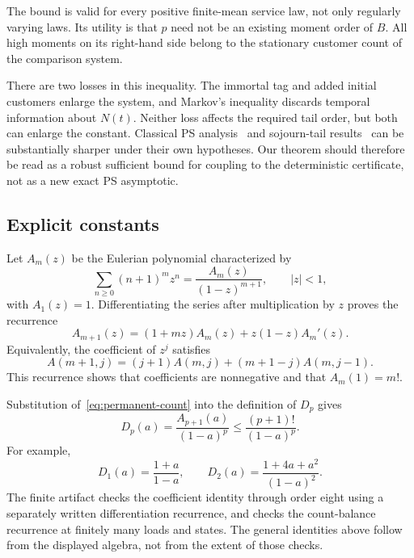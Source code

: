 The bound is valid for every positive finite-mean service law, not only regularly varying laws. Its utility is that $p$ need not be an existing moment order of $B$. All high moments on its right-hand side belong to the stationary customer count of the comparison system.

There are two losses in this inequality. The immortal tag and added initial customers enlarge the system, and Markov's inequality discards temporal information about $N(t)$. Neither loss affects the required tail order, but both can enlarge the constant. Classical PS analysis~\cite{yashkov1987} and sojourn-tail results~\cite{zwartboxma2000,guillemin2004,borst2006} can be substantially sharper under their own hypotheses. Our theorem should therefore be read as a robust sufficient bound for coupling to the deterministic certificate, not as a new exact PS asymptotic.

\subsection{Explicit constants}
Let $A_m(z)$ be the Eulerian polynomial characterized by
\begin{equation}\label{eq:eulerian-series}
 \sum_{n\geq0}(n+1)^m z^n
    =\frac{A_m(z)}{(1-z)^{m+1}},\qquad |z|<1,
\end{equation}
with $A_1(z)=1$. Differentiating the series after multiplication by $z$ proves the recurrence
\begin{equation}\label{eq:eulerian-recurrence}
 A_{m+1}(z)=(1+mz)A_m(z)+z(1-z)A_m'(z).
\end{equation}
Equivalently, the coefficient of $z^j$ satisfies
\[
 A(m+1,j)=(j+1)A(m,j)+(m+1-j)A(m,j-1).
\]
This recurrence shows that coefficients are nonnegative and that $A_m(1)=m!$.

Substitution of~\eqref{eq:permanent-count} into the definition of $D_p$ gives
\begin{equation}\label{eq:moment-eulerian}
 D_p(a)=\frac{A_{p+1}(a)}{(1-a)^p}
       \leq\frac{(p+1)!}{(1-a)^p}.
\end{equation}
For example,
\begin{equation}\label{eq:first-moments}
 D_1(a)=\frac{1+a}{1-a},\qquad
 D_2(a)=\frac{1+4a+a^2}{(1-a)^2}.
\end{equation}
The finite artifact checks the coefficient identity through order eight using a separately written differentiation recurrence, and checks the count-balance recurrence at finitely many loads and states. The general identities above follow from the displayed algebra, not from the extent of those checks.

